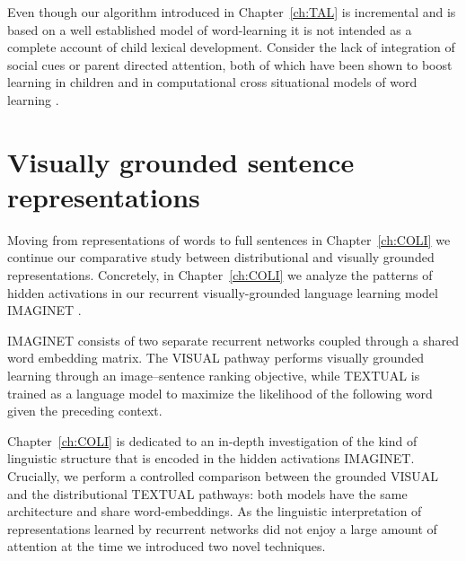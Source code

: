 Even though our algorithm introduced in Chapter~\ref{ch:TAL} is incremental
and is based on a well established model of word-learning \citep{fazly.etal.10} it is not intended as a
complete account of child lexical development. Consider 
the lack of integration of social cues or parent directed attention, both of which 
have been shown to boost learning in children 
\citep{gleitman1990structural,tomasello1995two} and in computational cross situational
models of word learning \citep{yu2007unified,lazaridou2016multimodal}.

\section{Visually grounded sentence representations}
Moving from representations of words to full sentences in Chapter~\ref{ch:COLI} we continue
our comparative study between distributional and visually grounded representations. 
Concretely, in Chapter~\ref{ch:COLI} we analyze the patterns of hidden activations in 
our recurrent visually-grounded language learning model 
\textsc{IMAGINET} \citep{chrupala2015learning}. 

\textsc{IMAGINET} consists of two separate recurrent networks coupled through a 
shared word embedding matrix. The \textsc{VISUAL}
pathway performs visually grounded learning through an image--sentence ranking objective, 
while \textsc{TEXTUAL} is trained as a language model to maximize the likelihood of the following word
given the preceding context.


Chapter~\ref{ch:COLI} is dedicated to an in-depth investigation
of the kind of linguistic structure that is encoded in the hidden activations \textsc{IMAGINET}. 
Crucially, we perform a controlled comparison between the grounded \textsc{VISUAL} and the distributional 
 \textsc{TEXTUAL} pathways: both models have the same architecture and share word-embeddings.
 As the linguistic interpretation of representations learned by recurrent networks did not enjoy a 
 large amount of  attention at the time we introduced two novel techniques. 
 
